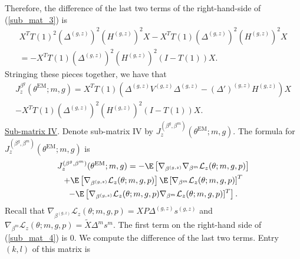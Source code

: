 \documentclass[12pt]{article}
\begin{document}
Therefore, the difference of the last two terms of the right-hand-side of (\ref{sub_mat_3}) is
\begin{multline*} X^T T(1)^2 (\Delta^{(g,z)})^2(H^{(g,z)})^2{X} - {X}^T T(1) (\Delta^{(g,z)})^2 (H^{(g,z)})^2 {X} \\ = - X^T T(1) \left(\Delta^{(g,z)}\right)^2 \left( H^{(g,z)} \right)^2 \left( I - T(1)  \right) X. \end{multline*}
Stringing these pieces together, we have that
\begin{multline}\label{sub_mat_3_formula}
J^{\beta^g}_z\left( \theta^{\textrm{EM}}; m, g \right) =  X^T T(1) ( \Delta^{(g,z)}V^{(g,z)}\Delta^{(g,z)} - (\Delta')^{(g,z)} H^{(g,z)}) X \\ - X^T T(1) \left(\Delta^{(g,z)}\right)^2 \left( H^{(g,z)} \right)^2 \left( I - T(1) \right) X.
\end{multline}
\underline{Sub-matrix IV}.  Denote sub-matrix IV by
 $J^{(\beta^{g}, \beta^m)}_z(\theta^{\textrm{EM}}; m, g).$ The formula for $J^{(\beta^{g}, \beta^m)}_z(\theta^{\textrm{EM}}; m, g)$ is
\begin{multline}\label{sub_mat_4}
J^{(\beta^g, \beta^m)}_z(\theta^{\textrm{EM}}; m, g)= - \E \left[\nabla_{\beta^{(g,z)}} \nabla_{\beta^m} \mathcal{L}_z (\theta; m, g, p) \right] \\ + \E\left[ \nabla_{\beta^{(g,z)} }\mathcal{L}_z(\theta ; m,g,p) \right]\E\left[\nabla_{\beta^m}\mathcal{L}_z(\theta; m,g,p)\right]^T \\ - \E \left[\nabla_{\beta^{(g,z)}}\mathcal{L}_z (\theta; m,g,p) \nabla_{\beta^m}\mathcal{L}_z(\theta; m,g,p)]^T \right].
\end{multline} Recall that $\nabla_{\beta^{(g,z)}} \mathcal{L}_z(\theta; m, g, p) = X P \Delta^{(g,z)} s^{(g,z)}$ and $\nabla_{\beta^m} \mathcal{L}_z(\theta; m, g, p) = \tilde{X} \Delta^m s^m.$ The first term on the right-hand side of (\ref{sub_mat_4}) is $0$. We compute the difference of the last two terms. Entry $(k,l)$ of this matrix is
\end{document}

